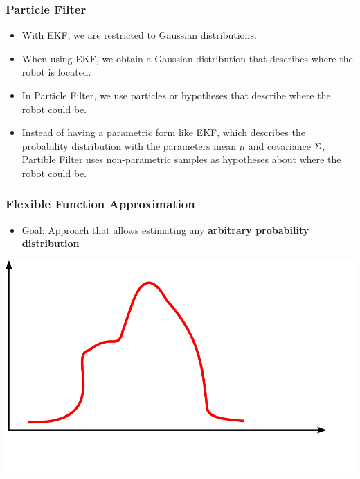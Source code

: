 \begin{frame}
    \frametitle{Particle Filter}
    \footnotesize
    \begin{itemize}
        \item With EKF, we are restricted to Gaussian distributions.
        \item When using EKF, we obtain a Gaussian distribution that describes where the robot is located.
        \item In Particle Filter, we use particles or hypotheses that describe where the robot could be.
        \item Instead of having a parametric form like EKF, which describes the probability distribution with the parameters mean $\mu$ and covariance $\Sigma$, Partible Filter uses non-parametric samples as hypotheses about where the robot could be.
        \end{itemize}
    
    \begin{center}
    \end{center}
    
\end{frame}

\begin{frame}
    \frametitle{Flexible Function Approximation}
    \footnotesize
    
    \begin{itemize}
        \item Goal: Approach that allows estimating any \textbf{arbitrary probability distribution}
    \end{itemize}
    
    \begin{center}
        \includegraphics[width=0.5\columnwidth]{./images/particle_filter/arbitrary_distribution.pdf}
    \end{center}

\end{frame}


